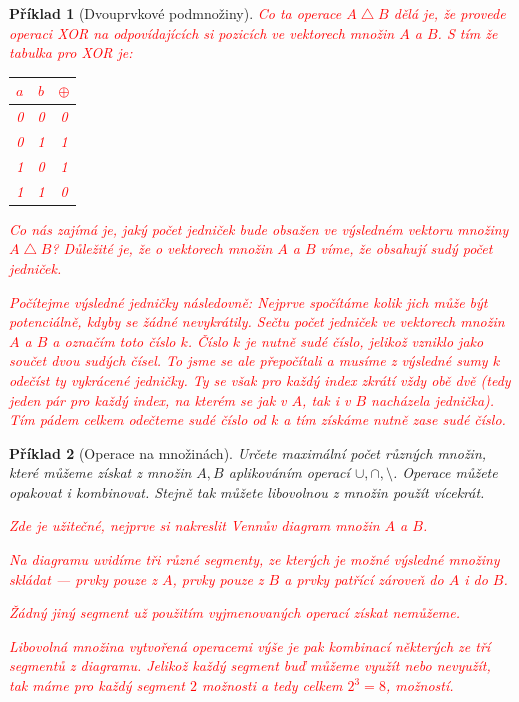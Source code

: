 \documentclass[10pt]{article}
\theoremstyle{definitionstyle}
\theoremstyle{problemstyle}
\newtheorem{problem}{Příklad}
\begin{document}
\begin{problem}[Dvouprvkové podmnožiny]
\textcolor{red}{Co ta operace $A \bigtriangleup B$ dělá je, že provede operaci XOR na odpovídajících si pozicích ve vektorech množin $A$ a $B$. S tím že tabulka pro XOR je:}

\textcolor{red}{
\begin{tabular}{|c|c|c|}
\hline
$a$ & $b$ & $\oplus$ \\
\hline
0 & 0 & 0 \\
0 & 1 & 1 \\
1 & 0 & 1 \\
1 & 1 & 0 \\
\hline
\end{tabular}
}

\textcolor{red}{Co nás zajímá je, jaký počet jedniček bude obsažen ve výsledném vektoru množiny $A \bigtriangleup B$? Důležité je, že o vektorech množin $A$ a $B$ víme, že obsahují sudý počet jedniček.}

\textcolor{red}{Počítejme výsledné jedničky následovně: Nejprve spočítáme kolik jich může být potenciálně, kdyby se žádné nevykrátily. Sečtu počet jedniček ve vektorech množin $A$ a $B$ a označím toto číslo $k$. Číslo $k$ je nutně sudé číslo, jelikož vzniklo jako součet dvou sudých čísel. To jsme se ale přepočítali a musíme z výsledné sumy $k$ odečíst ty vykrácené jedničky. Ty se však pro každý index zkrátí vždy obě dvě (tedy jeden pár pro každý index, na kterém se jak v $A$, tak i v $B$ nacházela jednička). Tím pádem celkem odečteme sudé číslo od $k$ a tím získáme nutně zase sudé číslo.}

\end{problem}

\begin{problem}[Operace na množinách]
Určete maximální počet různých množin, které můžeme získat z množin $A,B$ aplikováním operací $\cup, \cap, \setminus$. Operace můžete opakovat i kombinovat. Stejně tak můžete libovolnou z množin použít vícekrát.

\textcolor{red}{Zde je užitečné, nejprve si nakreslit Vennův diagram množin $A$ a $B$.}

\textcolor{red}{Na diagramu uvidíme tři různé segmenty, ze kterých je možné výsledné množiny skládat — prvky pouze z $A$, prvky pouze z $B$ a prvky patřící zároveň do $A$ i do $B$.}

\textcolor{red}{Žádný jiný segment už použitím vyjmenovaných operací získat nemůžeme.}

\textcolor{red}{Libovolná množina vytvořená operacemi výše je pak kombinací některých ze tří segmentů z diagramu. Jelikož každý segment buď můžeme využít nebo nevyužít, tak máme pro každý segment $2$ možnosti a tedy celkem $2^3 = 8$, možností.}

\end{problem}
\end{document}
